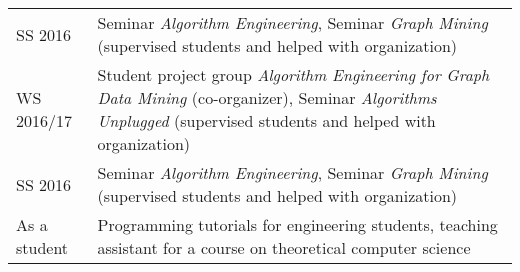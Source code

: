 \documentclass[11pt, a4paper, DIV=14, headings=small]{scrartcl}
\begin{document}
\begin{longtabu}{p{2.1cm}p{12.0cm}}
		SS 2016    & Seminar \emph{Algorithm Engineering}, Seminar \emph{Graph Mining} (supervised students and helped with organization)                                                            \\
		WS 2016/17   & Student project group \emph{Algorithm Engineering for Graph Data Mining} (co-organizer), Seminar \emph{Algorithms Unplugged} (supervised students and helped with organization) \\
		SS 2016      & Seminar \emph{Algorithm Engineering}, Seminar \emph{Graph Mining} (supervised students and helped with organization)                                                            \\
		As a student & Programming tutorials for engineering students, teaching assistant for a course on theoretical computer science                                                                 \\
	\end{longtabu}
	
\end{document}
